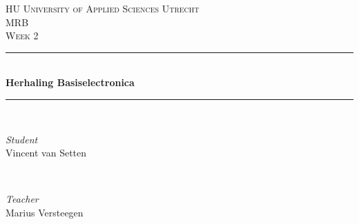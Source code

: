 \documentclass[fleqn]{article}
\newcommand\class{MRB}
\newcommand\classSubject{Herhaling Basiselectronica}
\newcommand\user{Vincent van Setten}
\newcommand\week{Week 2}
\newcommand\lecturer{Marius Versteegen}
\begin{document}
 

\renewcommand\makeheadrule{%
\begin{tikzpicture}[remember picture,overlay]
  \fill[hublue] 
  (-4,0) 
    rectangle
  (25, 20);
\end{tikzpicture}}

\begin{titlepage} 

{\selectfont
	\newcommand{\HRule}{\rule{\linewidth}{0.5mm}}
	
	\center
	
	
	\textsc{\LARGE HU University of Applied Sciences Utrecht}\\[1.5cm] 
	
	\textsc{\Large \class}\\[0.5cm] 
	
	\textsc{\large \week}\\[0.5cm]
	
	
	\HRule\\[0.4cm]
	
	{\huge\bfseries \classSubject}\\[0.4cm] %
	
	\HRule\\[1.5cm]
	
	
	\begin{minipage}{0.4\textwidth}
		\begin{flushleft}
			\large
			\textit{Student}\\
			\user %
		\end{flushleft}
	\end{minipage}
	~
	\begin{minipage}{0.4\textwidth}
		\begin{flushright}
			\large
			\textit{Teacher}\\
			\lecturer %
		\end{flushright}
	\end{minipage}
	
	
}
\end{titlepage}
\end{document}
